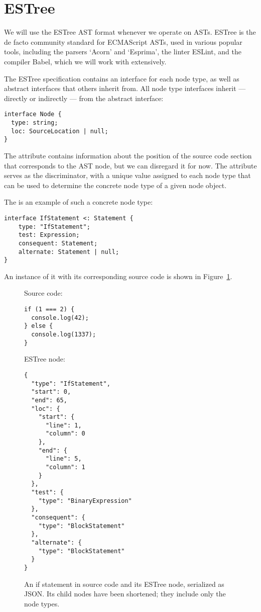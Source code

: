\section{ESTree}
We will use the ESTree AST format whenever we operate on ASTs.
ESTree is the de facto community standard for ECMAScript ASTs,
used in various popular tools, including
the parsers `Acorn' and `Esprima',
the linter ESLint, and
the compiler Babel,
which we will work with extensively.
\autocite{EstreeSpec}

The ESTree specification contains an interface for each node type,
as well as abstract interfaces that others inherit from.
All node type interfaces inherit --- directly or indirectly ---
from the abstract  interface: \autocite{EstreeSpec}
\begin{verbatim}
interface Node {
  type: string;
  loc: SourceLocation | null;
}
\end{verbatim}
The  attribute contains information about
the position of the source code section
that corresponds to the AST node,
but we can disregard it for now.
The  attribute serves as the discriminator,
with a unique value assigned to each node type
that can be used to determine
the concrete node type of a given node object.

The  is an example
of such a concrete node type:
\autocite{EstreeSpec}
\begin{verbatim}
interface IfStatement <: Statement {
    type: "IfStatement";
    test: Expression;
    consequent: Statement;
    alternate: Statement | null;
}
\end{verbatim}
An instance of it
with its corresponding source code
is shown in Figure~\ref{fig:EstreeIfStmt}.
\begin{figure}
  Source code:
  \begin{verbatim}
if (1 === 2) {
  console.log(42);
} else {
  console.log(1337);
}
  \end{verbatim}
	ESTree node:
  \begin{verbatim}
{
  "type": "IfStatement",
  "start": 0,
  "end": 65,
  "loc": {
    "start": {
      "line": 1,
      "column": 0
    },
    "end": {
      "line": 5,
      "column": 1
    }
  },
  "test": {
    "type": "BinaryExpression"
  },
  "consequent": {
    "type": "BlockStatement"
  },
  "alternate": {
    "type": "BlockStatement"
  }
}
  \end{verbatim}
  \caption{
    An if statement in source code and its
    ESTree node, serialized as JSON.
    Its child nodes have been shortened;
    they include only the node types.
  }\label{fig:EstreeIfStmt}
\end{figure}
